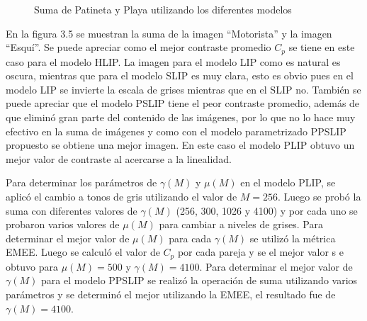 \begin{figure}
\begin{center}
		\caption{Suma de Patineta y Playa utilizando los diferentes modelos}
	\end{center}
\end{figure}

En la figura 3.5 se muestran la suma de la imagen ``Motorista'' y la imagen ``Esqu\'i''. Se puede apreciar como el mejor contraste promedio $C_p$ se tiene en este caso para el modelo HLIP. La imagen para el modelo LIP como es natural es oscura, mientras que para el modelo SLIP es muy clara, esto es obvio pues en el modelo LIP se invierte la escala de grises mientras que en el SLIP no. Tambi\'en se puede apreciar que el modelo PSLIP tiene el peor contraste promedio, adem\'as de que elimin\'o gran parte del contenido de las im\'agenes, por lo que no lo hace muy efectivo en la suma de im\'agenes y como con el modelo parametrizado PPSLIP propuesto se obtiene una mejor imagen. En este caso el modelo PLIP obtuvo un mejor valor de contraste al acercarse a la linealidad.

Para determinar los par\'ametros de $\gamma(M)$ y $\mu(M)$ en el modelo PLIP, se aplic\'o el cambio a tonos de gris utilizando el valor de $M=256$. Luego se prob\'o la suma con diferentes valores de $\gamma(M)$ (256, 300, 1026 y 4100) y por cada uno se probaron varios valores de $\mu(M)$ para cambiar a niveles de grises. Para determinar el mejor valor de $\mu(M)$ para cada $\gamma(M)$ se utiliz\'o la m\'etrica EMEE. Luego se calcul\'o el valor de $C_p$ por cada pareja y se el mejor valor s e obtuvo para $\mu(M)=500$ y $\gamma(M)=4100$. Para determinar el mejor valor de $\gamma(M)$ para el modelo PPSLIP se realiz\'o la operaci\'on de suma utilizando varios par\'ametros y se determin\'o el mejor utilizando la EMEE, el resultado fue de $\gamma(M)=4100$. 

